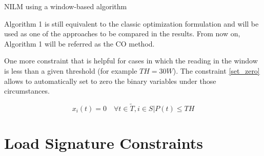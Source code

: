 \begin{algorithm}\label{algorithm1}
\SetAlgoLined
 \caption{NILM using a window-based algorithm}
\end{algorithm}

Algorithm 1 is still equivalent to the classic optimization formulation and will be used as one of the approaches to be compared in the results. From now on, Algorithm 1 will be referred as the CO method. 

One more constraint that is helpful for cases in which the reading in the window is less than a given threshold (for example $TH = 30W$). The constraint \eqref{set_zero} allows to automatically set to zero the binary variables under those circumstances. 

\begin{equation} \label{set_zero}
   x_i(t) = 0 \quad \forall t \in \tilde{T}, i \in S | P(t) \leq TH
\end{equation}

\section{Load Signature Constraints}

